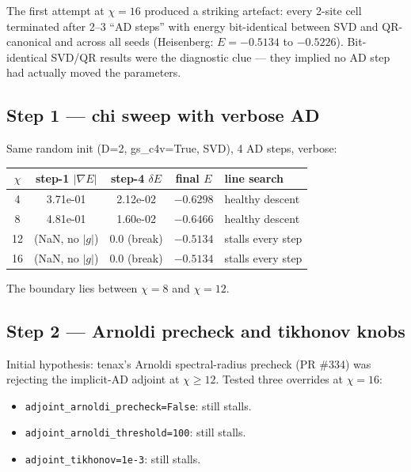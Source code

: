\documentclass[aps,prresearch,reprint,amsmath,amssymb,floatfix]{revtex4-2}
\newcommand{\code}[1]{\texttt{#1}}
\begin{document}
The first attempt at $\chi=16$ produced a striking artefact: every 2-site
cell terminated after 2--3 ``AD steps'' with energy bit-identical between
SVD and QR-canonical and across all seeds (Heisenberg: $E=-0.5134$ to
$-0.5226$).  Bit-identical SVD/QR results were the diagnostic clue ---
they implied no AD step had actually moved the parameters.

\subsection{Step 1 --- chi sweep with verbose AD}

Same random init (D=2, gs\_c4v=True, SVD), 4 AD steps, verbose:

\begin{table}[h]
\centering
\begin{tabular}{c c c c l}
\toprule
$\chi$ & step-1 $|\nabla E|$ & step-4 $\delta E$ & final $E$ & line search \\
\midrule
4  & 3.71e-01 & 2.12e-02 & $-0.6298$ & healthy descent \\
8  & 4.81e-01 & 1.60e-02 & $-0.6466$ & healthy descent \\
12 & (NaN, no $|g|$) & 0.0 (break) & $-0.5134$ & stalls every step \\
16 & (NaN, no $|g|$) & 0.0 (break) & $-0.5134$ & stalls every step \\
\bottomrule
\end{tabular}
\end{table}

The boundary lies between $\chi=8$ and $\chi=12$.

\subsection{Step 2 --- Arnoldi precheck and tikhonov knobs}

Initial hypothesis: tenax's Arnoldi spectral-radius precheck (PR \#334)
was rejecting the implicit-AD adjoint at $\chi\!\geq\!12$.  Tested three
overrides at $\chi=16$:

\begin{itemize}
  \item \code{adjoint\_arnoldi\_precheck=False}: still stalls.
  \item \code{adjoint\_arnoldi\_threshold=100}: still stalls.
  \item \code{adjoint\_tikhonov=1e-3}: still stalls.
\end{itemize}
\end{document}
